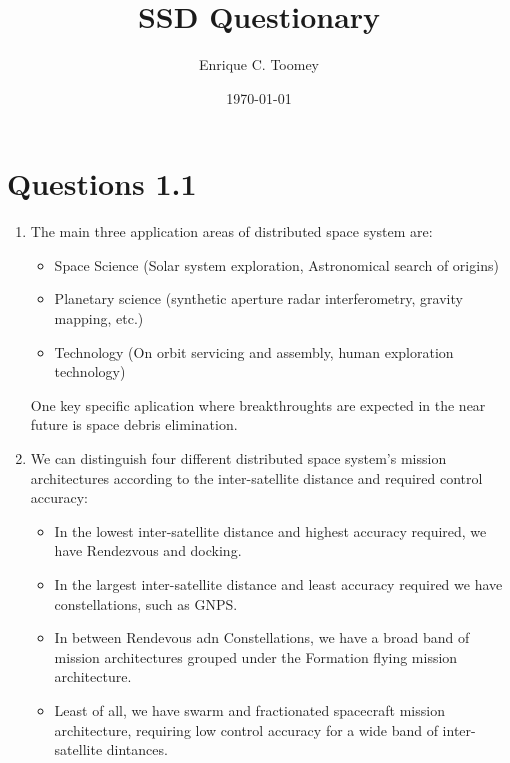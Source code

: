 \documentclass[a4paper]{article}
\begin{document}
\title{SSD Questionary}
\author{Enrique C. Toomey}
\date{\today}
\maketitle


\section{Questions 1.1}
\begin{enumerate}[label=\emph{\alph*)},series=preguntas1_1]
  \item %
    The main three application areas of distributed space system are:
  \begin{itemize}
    \item Space Science (Solar system exploration, Astronomical search of origins)
    \item Planetary science (synthetic aperture radar interferometry, gravity mapping, etc.)
    \item Technology (On orbit servicing and assembly, human exploration technology)
  \end{itemize}
  One key specific aplication where breakthroughts are expected in the near future is space debris elimination.

  \item %
    We can distinguish four different distributed space system's  mission architectures according to the inter-satellite distance and required control accuracy:
  \begin{itemize}
    \item In the lowest inter-satellite distance and highest accuracy required, we have Rendezvous and docking.
    \item In the largest inter-satellite distance and least accuracy required we have constellations, such as GNPS.
    \item In between Rendevous adn Constellations, we have a broad band of mission architectures grouped under the Formation flying mission architecture.
    \item Least of all, we have swarm and fractionated spacecraft mission architecture, requiring low control accuracy for a wide band of inter-satellite dintances.
  \end{itemize}


\end{enumerate}
\end{document}
